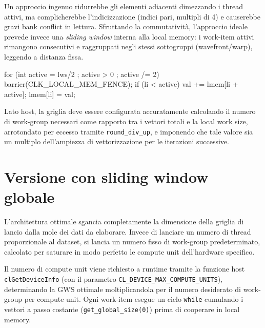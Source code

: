 Un approccio ingenuo ridurrebbe gli elementi adiacenti dimezzando i thread attivi, ma complicherebbe l'indicizzazione (indici pari, multipli di 4) e causerebbe gravi bank conflict in lettura. Sfruttando la commutatività, l'approccio ideale prevede invece una \emph{sliding window} interna alla local memory: i work-item attivi rimangono consecutivi e raggruppati negli stessi sottogruppi (wavefront/warp), leggendo a distanza fissa.

\begin{code}[caption={Riduzione interna al work-group in local memory}, label={code:reduce_lmem_loop}]
for (int active = lws/2 ; active > 0 ; active /= 2) {
    barrier(CLK_LOCAL_MEM_FENCE);
    if (li < active) {
        val += lmem[li + active];
        lmem[li] = val;
    }
}
\end{code}

Lato host, la griglia deve essere configurata accuratamente calcolando il numero di work-group necessari come rapporto tra i vettori totali e la local work size, arrotondato per eccesso tramite \texttt{round\_div\_up}, e imponendo che tale valore sia un multiplo dell'ampiezza di vettorizzazione per le iterazioni successive.

\section{Versione con sliding window globale}\label{sec:reduce_sliding}

L'architettura ottimale sgancia completamente la dimensione della griglia di lancio dalla mole dei dati da elaborare. Invece di lanciare un numero di thread proporzionale al dataset, si lancia un numero fisso di work-group predeterminato, calcolato per saturare in modo perfetto le compute unit dell'hardware specifico.

Il numero di compute unit viene richiesto a runtime tramite la funzione host \texttt{clGetDeviceInfo} (con il parametro \texttt{CL\_DEVICE\_MAX\_COMPUTE\_UNITS}), determinando la GWS ottimale moltiplicandola per il numero desiderato di work-group per compute unit. Ogni work-item esegue un ciclo \texttt{while} cumulando i vettori a passo costante (\texttt{get\_global\_size(0)}) prima di cooperare in local memory.

